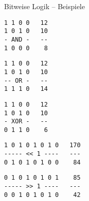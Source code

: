 \begin{frame}[fragile]{Bitweise Logik -- Beispiele}
%
%
\begin{center}
%
\begin{codebox}[AND]
\begin{verbatim}
1 1 0 0   12
1 0 1 0   10
- AND -   --
1 0 0 0    8
\end{verbatim}
\end{codebox}
%
\hspace{1em}
%
\begin{codebox}[OR]
\begin{verbatim}
1 1 0 0   12
1 0 1 0   10
-- OR -   --
1 1 1 0   14
\end{verbatim}
\end{codebox}
%
\hspace{1em}
%
\begin{codebox}[XOR]
\begin{verbatim}
1 1 0 0   12
1 0 1 0   10
- XOR -   --
0 1 1 0    6
\end{verbatim}
\end{codebox}
%
\end{center}
%
%
%
\begin{center}
%
\begin{codebox}
\begin{verbatim}
1 0 1 0 1 0 1 0   170
----- << 1 ----   ---
0 1 0 1 0 1 0 0    84
\end{verbatim}
\end{codebox}
%
\hspace{\fill}
%
\begin{codebox}
\begin{verbatim}
0 1 0 1 0 1 0 1    85
----- >> 1 ----   ---
0 0 1 0 1 0 1 0    42
\end{verbatim}
\end{codebox}
%
\end{center}
%
\end{frame}


